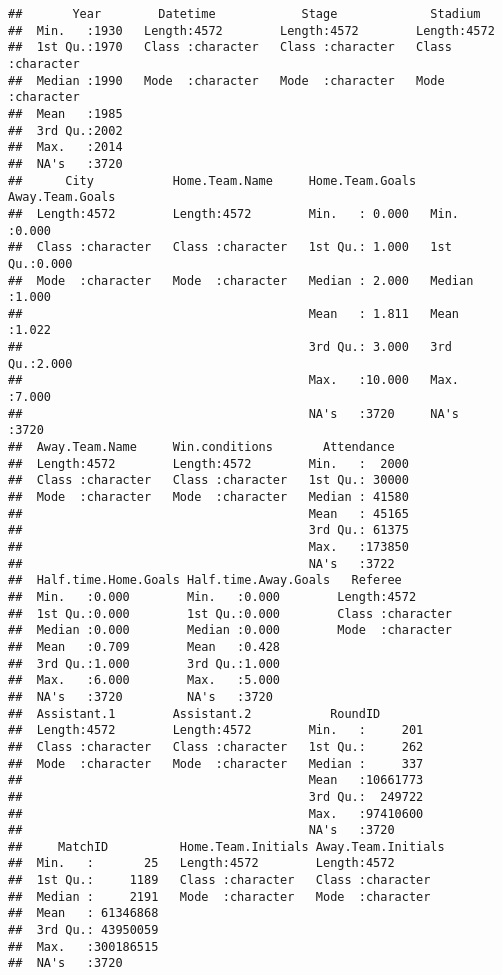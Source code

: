 \documentclass[]{article}
\begin{document}
\begin{verbatim}
##       Year        Datetime            Stage             Stadium         
##  Min.   :1930   Length:4572        Length:4572        Length:4572       
##  1st Qu.:1970   Class :character   Class :character   Class :character  
##  Median :1990   Mode  :character   Mode  :character   Mode  :character  
##  Mean   :1985                                                           
##  3rd Qu.:2002                                                           
##  Max.   :2014                                                           
##  NA's   :3720                                                           
##      City           Home.Team.Name     Home.Team.Goals  Away.Team.Goals
##  Length:4572        Length:4572        Min.   : 0.000   Min.   :0.000  
##  Class :character   Class :character   1st Qu.: 1.000   1st Qu.:0.000  
##  Mode  :character   Mode  :character   Median : 2.000   Median :1.000  
##                                        Mean   : 1.811   Mean   :1.022  
##                                        3rd Qu.: 3.000   3rd Qu.:2.000  
##                                        Max.   :10.000   Max.   :7.000  
##                                        NA's   :3720     NA's   :3720   
##  Away.Team.Name     Win.conditions       Attendance    
##  Length:4572        Length:4572        Min.   :  2000  
##  Class :character   Class :character   1st Qu.: 30000  
##  Mode  :character   Mode  :character   Median : 41580  
##                                        Mean   : 45165  
##                                        3rd Qu.: 61375  
##                                        Max.   :173850  
##                                        NA's   :3722    
##  Half.time.Home.Goals Half.time.Away.Goals   Referee         
##  Min.   :0.000        Min.   :0.000        Length:4572       
##  1st Qu.:0.000        1st Qu.:0.000        Class :character  
##  Median :0.000        Median :0.000        Mode  :character  
##  Mean   :0.709        Mean   :0.428                          
##  3rd Qu.:1.000        3rd Qu.:1.000                          
##  Max.   :6.000        Max.   :5.000                          
##  NA's   :3720         NA's   :3720                           
##  Assistant.1        Assistant.2           RoundID        
##  Length:4572        Length:4572        Min.   :     201  
##  Class :character   Class :character   1st Qu.:     262  
##  Mode  :character   Mode  :character   Median :     337  
##                                        Mean   :10661773  
##                                        3rd Qu.:  249722  
##                                        Max.   :97410600  
##                                        NA's   :3720      
##     MatchID          Home.Team.Initials Away.Team.Initials
##  Min.   :       25   Length:4572        Length:4572       
##  1st Qu.:     1189   Class :character   Class :character  
##  Median :     2191   Mode  :character   Mode  :character  
##  Mean   : 61346868                                        
##  3rd Qu.: 43950059                                        
##  Max.   :300186515                                        
##  NA's   :3720
\end{verbatim}
\end{document}
